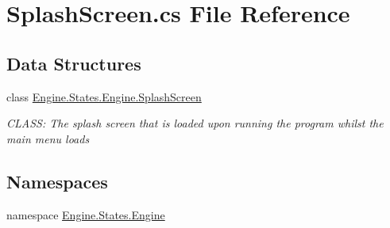 \hypertarget{a00197}{}\section{Splash\+Screen.\+cs File Reference}
\label{a00197}
\subsection*{Data Structures}
\begin{DoxyCompactItemize}
\item 
class \hyperlink{a00554}{Engine.\+States.\+Engine.\+Splash\+Screen}
\begin{DoxyCompactList}\small\item\em C\+L\+A\+SS\+: The splash screen that is loaded upon running the program whilst the main menu loads \end{DoxyCompactList}\end{DoxyCompactItemize}
\subsection*{Namespaces}
\begin{DoxyCompactItemize}
\item 
namespace \hyperlink{a00276}{Engine.\+States.\+Engine}
\end{DoxyCompactItemize}
